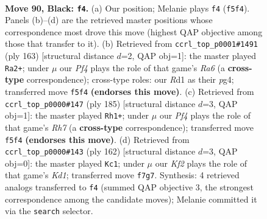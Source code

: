 \documentclass[11pt]{article}
\begin{document}
\clearpage

\begin{figure}[p]\centering
\begin{subfigure}{0.46\textwidth}\centering
\resizebox{\linewidth}{!}{%
\newchessgame
\chessboard[
  setfen={1R6/5k2/8/5p2/8/7K/8/3r4 b - - 9 90},
  showmover=false,
  pgfstyle=straightmove, color=movearrow, markmove={f5-f4}
]}
\caption{}
\end{subfigure}\hfill
\begin{subfigure}{0.46\textwidth}\centering
\resizebox{\linewidth}{!}{%
\newchessgame
\chessboard[
  setfen={8/6k1/1R6/8/6P1/r7/6K1/8 b - - 4 82},
  showmover=false,
  pgfstyle=straightmove, color=movearrow, markmove={a3-a2}
]}
\caption{}
\end{subfigure}
\\[4pt]
\begin{subfigure}{0.46\textwidth}\centering
\resizebox{\linewidth}{!}{%
\newchessgame
\chessboard[
  setfen={1k6/8/8/8/8/2R5/7r/3K4 b - - 17 93},
  showmover=false,
  pgfstyle=straightmove, color=movearrow, markmove={h2-h1}
]}
\caption{}
\end{subfigure}\hfill
\begin{subfigure}{0.46\textwidth}\centering
\resizebox{\linewidth}{!}{%
\newchessgame
\chessboard[
  setfen={2k5/6r1/8/8/8/7R/8/3K4 w - - 33 82},
  showmover=false,
  pgfstyle=straightmove, color=movearrow, markmove={d1-c1}
]}
\caption{}
\end{subfigure}
\caption{\textbf{Move 90, Black: \texttt{f4}.} (a) Our position; Melanie plays \texttt{f4} (\texttt{f5f4}). Panels (b)--(d) are the retrieved master positions whose correspondence most drove this move (highest QAP objective among those that transfer to it). (b) Retrieved from \texttt{ccrl\_top\_p0001\#1491} (ply 163) [structural distance $d$=2, QAP obj=1]: the master played \texttt{Ra2+}; under $\mu$ our \emph{Pf4} plays the role of that game's \emph{Ra6} (a \textbf{cross-type} correspondence); cross-type roles: our \emph{R}d1 as their \emph{p}g4; transferred move \texttt{f5f4} \textbf{(endorses this move)}. (c) Retrieved from \texttt{ccrl\_top\_p0000\#147} (ply 185) [structural distance $d$=3, QAP obj=1]: the master played \texttt{Rh1+}; under $\mu$ our \emph{Pf4} plays the role of that game's \emph{Rh7} (a \textbf{cross-type} correspondence); transferred move \texttt{f5f4} \textbf{(endorses this move)}. (d) Retrieved from \texttt{ccrl\_top\_p0000\#143} (ply 162) [structural distance $d$=3, QAP obj=0]: the master played \texttt{Kc1}; under $\mu$ our \emph{Kf2} plays the role of that game's \emph{Kd1}; transferred move \texttt{f7g7}. Synthesis: 4 retrieved analogs transferred to \texttt{f4} (summed QAP objective 3, the strongest correspondence among the candidate moves); Melanie committed it via the \texttt{search} selector.}
\label{fig:thought-m179}
\end{figure}
\end{document}
